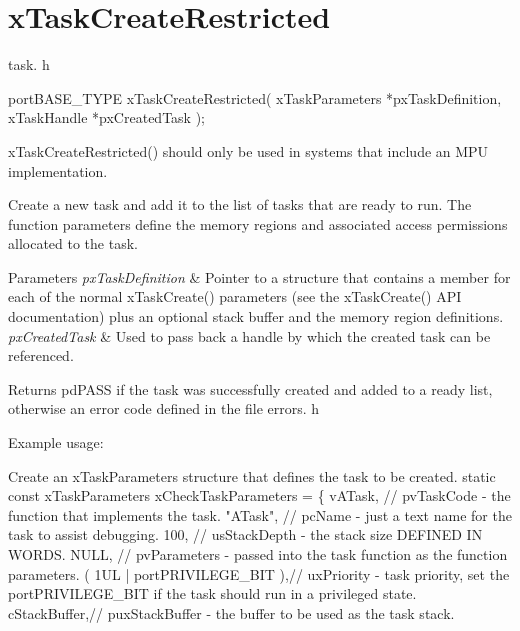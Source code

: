 \hypertarget{group__x_task_create_restricted}{\section{x\-Task\-Create\-Restricted}
\label{group__x_task_create_restricted}
}
task. h 
\begin{DoxyPre}
 portBASE\_TYPE xTaskCreateRestricted( xTaskParameters *pxTaskDefinition, xTaskHandle *pxCreatedTask );\end{DoxyPre}


x\-Task\-Create\-Restricted() should only be used in systems that include an M\-P\-U implementation.

Create a new task and add it to the list of tasks that are ready to run. The function parameters define the memory regions and associated access permissions allocated to the task.


\begin{DoxyParams}{Parameters}
{\em px\-Task\-Definition} & Pointer to a structure that contains a member for each of the normal x\-Task\-Create() parameters (see the x\-Task\-Create() A\-P\-I documentation) plus an optional stack buffer and the memory region definitions.\\
\hline
{\em px\-Created\-Task} & Used to pass back a handle by which the created task can be referenced.\\
\hline
\end{DoxyParams}
\begin{DoxyReturn}{Returns}
pd\-P\-A\-S\-S if the task was successfully created and added to a ready list, otherwise an error code defined in the file errors. h
\end{DoxyReturn}
Example usage\-: 
\begin{DoxyPre}
Create an xTaskParameters structure that defines the task to be created.
static const xTaskParameters xCheckTaskParameters =
\{
        vATask,         // pvTaskCode - the function that implements the task.
        "ATask",        // pcName - just a text name for the task to assist debugging.
        100,            // usStackDepth - the stack size DEFINED IN WORDS.
        NULL,           // pvParameters - passed into the task function as the function parameters.
        ( 1UL | portPRIVILEGE\_BIT ),// uxPriority - task priority, set the portPRIVILEGE\_BIT if the task should run in a privileged state.
        cStackBuffer,// puxStackBuffer - the buffer to be used as the task stack.\end{DoxyPre}



